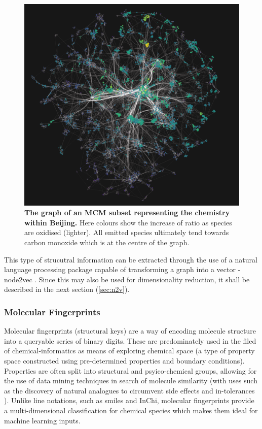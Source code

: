 \begin{figure}[h]
  \centering
  \includegraphics[width=\textwidth]{4fig/graph/oxidised_ratio.png}
  \caption{\textbf{The graph of an MCM subset representing the chemistry within Beijing.} Here colours show the increase of  ratio as species are oxidised (lighter). All emitted species ultimately tend towards carbon monoxide which is at the centre of the graph. }
  \label{fig:vk}
\end{figure}

This type of strucutral information can be extracted through the use of a natural language processing package capable of transforming a graph into a vector - node2vec \citep{node2vec}. Since this may also be used for dimensionality reduction, it shall be described in the next section (\autoref{sec:n2v}).




\subsubsection{Molecular Fingerprints}\label{sec:fingerprints}


Molecular fingerprints (structural keys) are a way of encoding molecule structure into a queryable series of binary digits. These are predominately used in the filed of chemical-informatics as means of exploring chemical space (a type of property space constructed using pre-determined properties and boundary conditions). Properties are often split into structural and psyico-chemical groups, allowing for the use of data mining techniques in search of molecule similarity (with uses such as the discovery of natural analogues to circumvent side effects and in-tolerances \citep{analog}). Unlike line notations, such as smiles and InChi, molecular fingerprints provide a multi-dimensional classification for chemical species which makes them ideal for machine learning inputs.

